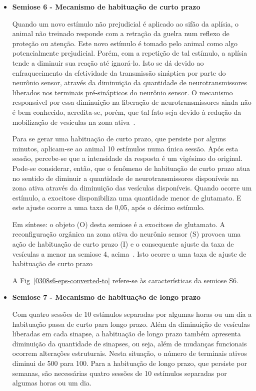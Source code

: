 \begin{itemize}
	\item \textbf{Semiose 6 - Mecanismo de habituação de curto prazo}


	Quando um novo estímulo não prejudicial é aplicado ao sifão da aplísia, o animal não treinado responde com a retração da guelra num reflexo de proteção ou atenção. Este novo estímulo é tomado pelo animal como algo potencialmente prejudicial. Porém, com a repetição de tal estímulo, a aplísia tende a diminuir sua reação até ignorá-lo. Isto se dá devido ao enfraquecimento da efetividade da transmissão sináptica por parte do neurônio sensor, através da diminuição da quantidade de neurotransmissores liberados nos terminais pré-sinápticos do neurônio sensor. O mecanismo responsável por essa diminuição na liberação de neurotransmissores ainda não é bem conhecido, acredita-se, porém, que tal fato seja devido à redução da mobilização de vesículas na zona ativa~\cite{kandel06, kandel00}.

	Para se gerar uma habituação de curto prazo, que persiste por alguns minutos, aplicam-se ao animal 10 estímulos numa única sessão. Após esta sessão, percebe-se que a intensidade da resposta é um vigésimo do original.  Pode-se considerar, então, que o fenômeno de habituação de curto prazo atua no sentido de diminuir a quantidade de neurotransmissores disponíveis na zona ativa através da diminuição das vesículas disponíveis. Quando ocorre um estímulo, a exocitose disponibiliza uma quantidade menor de glutamato. E este ajuste ocorre a uma taxa de 0,05, após o décimo estímulo.

	Em síntese: o objeto (O) desta semiose é a exocitose de glutamato. A reconfiguração orgânica na zona ativa do neurônio sensor (S) provoca uma ação de habituação de curto prazo (I) e o consequente ajuste da taxa de vesículas a menor na semiose 4, acima~\cite{kandel06, kandel00}. Isto ocorre a uma taxa de ajuste de habituação de curto prazo

	A Fig~\ref{0308s6-eps-converted-to} refere-se às características da semiose S6.

	\item \textbf{Semiose 7 - Mecanismo de habituação de longo prazo}

	Com quatro sessões de 10 estímulos separadas por algumas horas ou um dia a habituação passa de curto para longo prazo. Além da diminuição de vesículas liberadas em cada sinapse, a habituação de longo prazo também apresenta diminuição da quantidade de sinapses, ou seja, além de mudanças funcionais ocorrem alterações estruturais. Nesta situação, o número de terminais ativos diminui de 500 para 100. Para a habituação de longo prazo, que persiste por semanas, são necessárias quatro sessões de 10 estímulos separadas por algumas horas ou um dia.


\end{itemize}
